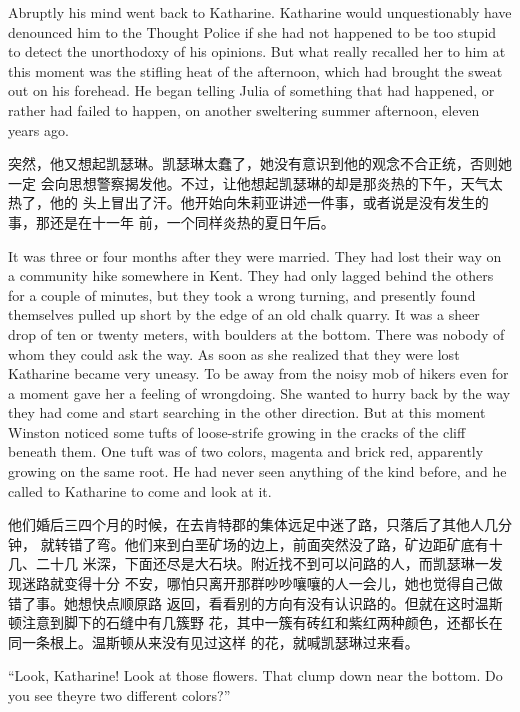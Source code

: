 \begin{paracol}{2}
Abruptly his mind went back to Katharine. Katharine would unquestionably
have denounced him to the Thought Police if she had not happened to be
too stupid to detect the unorthodoxy of his opinions. But what really
recalled her to him at this moment was the stifling heat of the
afternoon, which had brought the sweat out on his forehead. He began
telling Julia of something that had happened, or rather had failed to
happen, on another sweltering summer afternoon, eleven years ago.

\switchcolumn

突然，他又想起凯瑟琳。凯瑟琳太蠢了，她没有意识到他的观念不合正统，否则她一定
会向思想警察揭发他。不过，让他想起凯瑟琳的却是那炎热的下午，天气太热了，他的
头上冒出了汗。他开始向朱莉亚讲述一件事，或者说是没有发生的事，那还是在十一年
前，一个同样炎热的夏日午后。

\switchcolumn*

It was three or four months after they were married. They had lost their
way on a community hike somewhere in Kent. They had only lagged behind
the others for a couple of minutes, but they took a wrong turning, and
presently found themselves pulled up short by the edge of an old chalk
quarry. It was a sheer drop of ten or twenty meters, with boulders at
the bottom. There was nobody of whom they could ask the way. As soon as
she realized that they were lost Katharine became very uneasy. To be
away from the noisy mob of hikers even for a moment gave her a feeling
of wrongdoing. She wanted to hurry back by the way they had come and
start searching in the other direction. But at this moment Winston
noticed some tufts of loose-strife growing in the cracks of the cliff
beneath them. One tuft was of two colors, magenta and brick red,
apparently growing on the same root. He had never seen anything of the
kind before, and he called to Katharine to come and look at it.

\switchcolumn

他们婚后三四个月的时候，在去肯特郡的集体远足中迷了路，只落后了其他人几分钟，
就转错了弯。他们来到白垩矿场的边上，前面突然没了路，矿边距矿底有十几、二十几
米深，下面还尽是大石块。附近找不到可以问路的人，而凯瑟琳一发现迷路就变得十分
不安，哪怕只离开那群吵吵嚷嚷的人一会儿，她也觉得自己做错了事。她想快点顺原路
返回，看看别的方向有没有认识路的。但就在这时温斯顿注意到脚下的石缝中有几簇野
花，其中一簇有砖红和紫红两种颜色，还都长在同一条根上。温斯顿从来没有见过这样
的花，就喊凯瑟琳过来看。

\switchcolumn*

``Look, Katharine! Look at those flowers. That clump down near the
bottom. Do you see they\textquotesingle re two different colors?''


\end{paracol}
